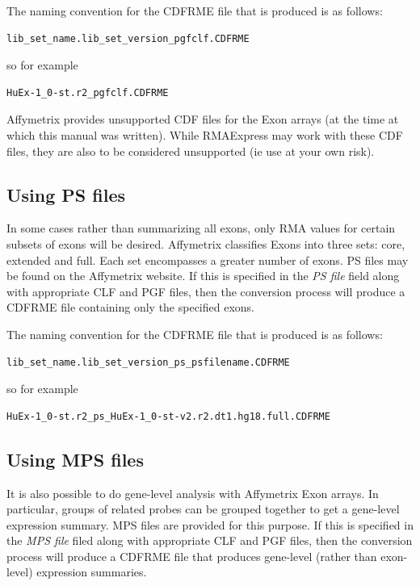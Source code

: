 \documentclass[11pt]{report}
\begin{document}
The naming convention for the CDFRME file that is produced is as follows: 
\begin{verbatim}
lib_set_name.lib_set_version_pgfclf.CDFRME 
\end{verbatim}
so for example 
\begin{verbatim}
HuEx-1_0-st.r2_pgfclf.CDFRME
\end{verbatim}

Affymetrix provides unsupported CDF files for the Exon arrays (at the time at which this manual was written). While RMAExpress may work with these CDF files, they are also to be considered unsupported (ie use at your own risk).


\subsection{Using PS files}

In some cases rather than summarizing all exons, only RMA values for certain subsets of exons will be desired. Affymetrix classifies Exons into three sets: core, extended and full. Each set encompasses a greater number of exons. PS files may be found on the Affymetrix website. If this is specified in the {\it PS file} field along with appropriate CLF and PGF files, then the conversion process will produce a CDFRME file containing only the specified exons. 

The naming convention for the CDFRME file that is produced is as follows: 
\begin{verbatim}
lib_set_name.lib_set_version_ps_psfilename.CDFRME
\end{verbatim}
so for example 
\begin{verbatim}
HuEx-1_0-st.r2_ps_HuEx-1_0-st-v2.r2.dt1.hg18.full.CDFRME
\end{verbatim}

\subsection{Using MPS files}

It is also possible to do gene-level analysis with Affymetrix Exon arrays. In particular, groups of related probes can be grouped together to get a gene-level expression summary. MPS files are provided for this purpose. If this is specified in the {\it MPS file} filed along with appropriate CLF and PGF files, then the conversion process will produce a CDFRME file that produces gene-level (rather than exon-level) expression summaries.
\end{document}
